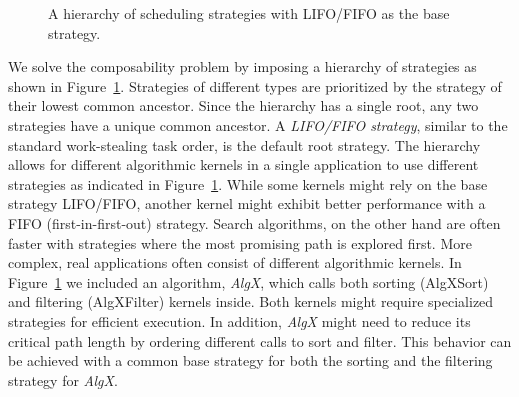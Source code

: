 \documentclass[a4paper,11pt]{article}
\begin{document}
\begin{figure}
\begin{center}
\end{center}
\caption{A hierarchy of scheduling strategies with LIFO/FIFO as the
  base strategy.}
\label{fig:strat_hier}
\end{figure}

We solve the composability problem by imposing a hierarchy of
strategies as shown in Figure~\ref{fig:strat_hier}.  Strategies of
different types are prioritized by the strategy of their lowest common
ancestor. Since the hierarchy has a single root, any two strategies
have a unique common ancestor.  A \emph{LIFO/FIFO strategy}, similar
to the standard work-stealing task order, is the default root
strategy.  The hierarchy allows for different algorithmic kernels in a
single application to use different strategies as indicated in
Figure~\ref{fig:strat_hier}. While some kernels might rely on the base
strategy LIFO/FIFO, another kernel might exhibit better performance
with a FIFO (first-in-first-out) strategy. Search algorithms, on the
other hand are often faster with strategies where the most promising
path is explored first.  More complex, real applications often consist
of different algorithmic kernels.  In Figure~\ref{fig:strat_hier} we
included an algorithm, \emph{AlgX}, which calls both sorting
(AlgXSort) and filtering (AlgXFilter) kernels inside. Both kernels
might require specialized strategies for efficient execution. In
addition, \emph{AlgX} might need to reduce its critical path length by
ordering different calls to sort and filter. This behavior can be
achieved with a common base strategy for both the sorting and the
filtering strategy for \emph{AlgX}.
\end{document}
